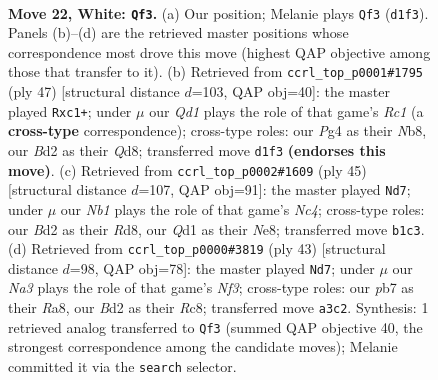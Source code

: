 \documentclass[11pt]{article}
\begin{document}
\clearpage

\begin{figure}[p]\centering
\begin{subfigure}{0.46\textwidth}\centering
\resizebox{\linewidth}{!}{%
\newchessgame
\chessboard[
  setfen={r3r3/1ppb1pkp/8/p2p2b1/3n2P1/NP2P3/P2B1P1q/RN1QRK2 w - - 0 22},
  showmover=false,
  pgfstyle=straightmove, color=movearrow, markmove={d1-f3}
]}
\caption{}
\end{subfigure}\hfill
\begin{subfigure}{0.46\textwidth}\centering
\resizebox{\linewidth}{!}{%
\newchessgame
\chessboard[
  setfen={1nrq2k1/5pbp/1r2pnp1/1p4B1/3PB1N1/1Q4P1/5P1P/1RR3K1 b - - 0 24},
  showmover=false,
  pgfstyle=straightmove, color=movearrow, markmove={c8-c1}
]}
\caption{}
\end{subfigure}
\\[4pt]
\begin{subfigure}{0.46\textwidth}\centering
\resizebox{\linewidth}{!}{%
\newchessgame
\chessboard[
  setfen={2rrn1k1/4qpp1/4p2p/p1nb4/2N2Q2/P3P2P/4BPP1/B2RR1K1 b - - 1 23},
  showmover=false,
  pgfstyle=straightmove, color=movearrow, markmove={c5-d7}
]}
\caption{}
\end{subfigure}\hfill
\begin{subfigure}{0.46\textwidth}\centering
\resizebox{\linewidth}{!}{%
\newchessgame
\chessboard[
  setfen={r1r3k1/1q2ppbp/p1b2np1/Q7/NP6/4P3/4BPPP/2RRB1K1 b - - 8 22},
  showmover=false,
  pgfstyle=straightmove, color=movearrow, markmove={f6-d7}
]}
\caption{}
\end{subfigure}
\caption{\textbf{Move 22, White: \texttt{Qf3}.} (a) Our position; Melanie plays \texttt{Qf3} (\texttt{d1f3}). Panels (b)--(d) are the retrieved master positions whose correspondence most drove this move (highest QAP objective among those that transfer to it). (b) Retrieved from \texttt{ccrl\_top\_p0001\#1795} (ply 47) [structural distance $d$=103, QAP obj=40]: the master played \texttt{Rxc1+}; under $\mu$ our \emph{Qd1} plays the role of that game's \emph{Rc1} (a \textbf{cross-type} correspondence); cross-type roles: our \emph{P}g4 as their \emph{N}b8, our \emph{B}d2 as their \emph{Q}d8; transferred move \texttt{d1f3} \textbf{(endorses this move)}. (c) Retrieved from \texttt{ccrl\_top\_p0002\#1609} (ply 45) [structural distance $d$=107, QAP obj=91]: the master played \texttt{Nd7}; under $\mu$ our \emph{Nb1} plays the role of that game's \emph{Nc4}; cross-type roles: our \emph{B}d2 as their \emph{R}d8, our \emph{Q}d1 as their \emph{N}e8; transferred move \texttt{b1c3}. (d) Retrieved from \texttt{ccrl\_top\_p0000\#3819} (ply 43) [structural distance $d$=98, QAP obj=78]: the master played \texttt{Nd7}; under $\mu$ our \emph{Na3} plays the role of that game's \emph{Nf3}; cross-type roles: our \emph{p}b7 as their \emph{R}a8, our \emph{B}d2 as their \emph{R}c8; transferred move \texttt{a3c2}. Synthesis: 1 retrieved analog transferred to \texttt{Qf3} (summed QAP objective 40, the strongest correspondence among the candidate moves); Melanie committed it via the \texttt{search} selector.}
\label{fig:thought-m42}
\end{figure}
\end{document}
